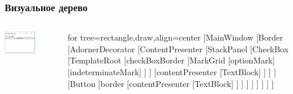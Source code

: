 \documentclass[xetex,mathserif,serif]{beamer}
\begin{document}
	\begin{frame}
		\frametitle{Визуальное дерево}
		\begin{columns}
			\begin{column}{0.4\textwidth}
				\begin{center}
					\includegraphics[width=0.6\textwidth]{wpfApp.png}
				\end{center}
			\end{column}
			\begin{column}{0.6\textwidth}
				\begin{tiny}
					\begin{forest}
						for tree={rectangle,draw,align=center}
						[MainWindow
							[Border
								[AdornerDecorator
									[ContentPresenter
										[StackPanel
											[CheckBox
												[TemplateRoot
													[checkBoxBorder
														[MarkGrid
															[optionMark]
															[indeterminateMark]
														]
													]
													[contentPresenter
														[TextBlock]
													]
												]
											]
											[Button
												[border
													[contentPresenter
														[TextBlock]
													]
												]
											]
										]
									]
								]
							]
						]
					\end{forest}
				\end{tiny}
			\end{column}
		\end{columns}
	\end{frame}
\end{document}

